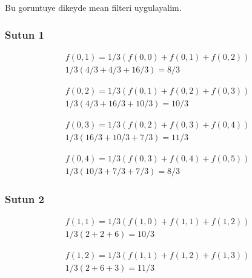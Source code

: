\documentclass[12pt]{article}
\begin{document}
Bu goruntuye dikeyde mean filteri uygulayalim.

\subsubsection{Sutun 1}

\begin{equation}
\begin{split}
f(0,1) = 1/3 (f(0,0)+f(0,1)+f(0,2)) \\
1/3 (4/3+4/3+16/3) = 8/3
\end{split}
\end{equation}

\begin{equation}
\begin{split}
f(0,2) = 1/3 (f(0,1)+f(0,2)+f(0,3)) \\
1/3 (4/3+16/3+10/3) = 10/3
\end{split}
\end{equation}

\begin{equation}
\begin{split}
f(0,3) = 1/3 (f(0,2)+f(0,3)+f(0,4)) \\
1/3 (16/3+10/3+7/3) = 11/3
\end{split}
\end{equation}

\begin{equation}
\begin{split}
f(0,4) = 1/3 (f(0,3)+f(0,4)+f(0,5)) \\
1/3 (10/3+7/3+7/3) = 8/3
\end{split}
\end{equation}

\subsubsection{Sutun 2}

\begin{equation}
\begin{split}
f(1,1) = 1/3 (f(1,0)+f(1,1)+f(1,2)) \\
1/3 (2+2+6) = 10/3
\end{split}
\end{equation}

\begin{equation}
\begin{split}
f(1,2) = 1/3 (f(1,1)+f(1,2)+f(1,3)) \\
1/3 (2+6+3) = 11/3
\end{split}
\end{equation}
\end{document}
